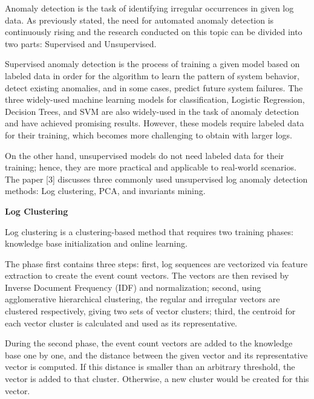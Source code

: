 \documentclass[12pt,a4paper]{article}
\begin{document}
	\noindent Anomaly detection is the task of identifying irregular occurrences in given log data. As previously stated, the need for automated anomaly detection is continuously rising and the research conducted on this topic can be divided into two parts: Supervised and Unsupervised. 
	\vspace{0.15cm}
	
	\noindent Supervised anomaly detection is the process of training a given model based on labeled data in order for the algorithm to learn the pattern of system behavior, detect existing anomalies, and in some cases, predict future system failures. The three widely-used machine learning models for classification, Logistic Regression, Decision Trees, and SVM are also widely-used in the task of anomaly detection and have achieved promising results. However, these models require labeled data for their training, which becomes more challenging to obtain with larger logs.
	
	\vspace{0.15cm}
	
	\noindent On the other hand, unsupervised models do not need labeled data for their training; hence, they are more practical and applicable to real-world scenarios. The paper [3] discusses three commonly used unsupervised log anomaly detection methods: Log clustering, PCA, and invariants mining.
	
	\vspace{0.3cm}
	\noindent \textbf{Log Clustering}
	\vspace{0.2cm}
	
	\noindent Log clustering is a clustering-based method that requires two training phases: knowledge base initialization and online learning. 
	
	\vspace{0.15cm}
	
	\noindent The phase first contains three steps: first, log sequences are vectorized via feature extraction to create the event count vectors. The vectors are then revised by Inverse Document Frequency (IDF) and normalization; second, using agglomerative hierarchical clustering, the regular and irregular vectors are clustered respectively, giving two sets of vector clusters; third, the centroid for each vector cluster is calculated and used as its representative.
	
	\vspace{0.15cm}
	
	\noindent During the second phase, the event count vectors are added to the knowledge base one by one, and the distance between the given vector and its representative vector is computed. If this distance is smaller than an arbitrary threshold, the vector is added to that cluster. Otherwise, a new cluster would be created for this vector.
	
\end{document}
